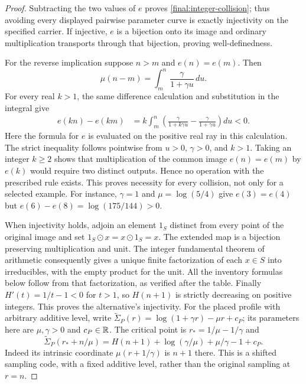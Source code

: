 \begin{proof}
Subtracting the two values of $e$ proves
\eqref{final:integer-collision}; thus avoiding every displayed
pairwise parameter curve is exactly injectivity on the specified
carrier.  If injective, $e$ is a bijection onto its image and ordinary
multiplication transports through that bijection, proving
well-definedness.

For the reverse implication suppose $n>m$ and $e(n)=e(m)$.  Then
\[
 \mu(n-m)=\int_m^n\frac{\gamma}{1+\gamma u}\,du.
\]
For every real $k>1$, the same difference calculation and substitution
in the integral give
\begin{align*}
 e(kn)-e(km)
  &=k\int_m^n\left(\frac{\gamma}{1+k\gamma u}
                        -\frac{\gamma}{1+\gamma u}\right)du<0.
\end{align*}
Here the formula for $e$ is evaluated on the positive real ray in
this calculation.  The strict inequality follows pointwise from
$u>0$, $\gamma>0$, and $k>1$.  Taking an integer $k\geq2$ shows that
multiplication of the common image $e(n)=e(m)$ by $e(k)$ would
require two distinct outputs.  Hence no operation with the prescribed
rule exists.  This proves necessity for every collision, not only
for a selected example.  For instance, $\gamma=1$ and
$\mu=\log(5/4)$ give $e(3)=e(4)$ but
$e(6)-e(8)=\log(175/144)>0$.

When injectivity holds, adjoin an element $1_S$ distinct from every
point of the original image and set $1_S\odot x=x\odot1_S=x$.
The extended map is a bijection preserving multiplication and unit.
The integer fundamental theorem of arithmetic consequently gives a
unique finite factorization of each $x\in S$ into irreducibles,
with the empty product for the unit.  All the inventory formulas
below follow from that factorization, as verified after the table.
Finally $H'(t)=1/t-1<0$ for $t>1$, so $H(n+1)$ is strictly decreasing
on positive integers.  This proves the alternative's injectivity.
For the placed profile with arbitrary additive level, write
$\widetilde\Sigma_P(r)=\log(1+\gamma r)-\mu r+c_P$;
its parameters here are $\mu,\gamma>0$ and $c_P\in\mathbb R$.
The critical point is
$r_*=1/\mu-1/\gamma$ and
\[
 \widetilde\Sigma_P(r_*+n/\mu)=H(n+1)
                   +\log(\gamma/\mu)+\mu/\gamma-1+c_P.
\]
Indeed its intrinsic coordinate $\mu(r+1/\gamma)$ is $n+1$ there.
This is a shifted sampling code, with a fixed additive level, rather
than the original sampling at $r=n$.
\end{proof}

